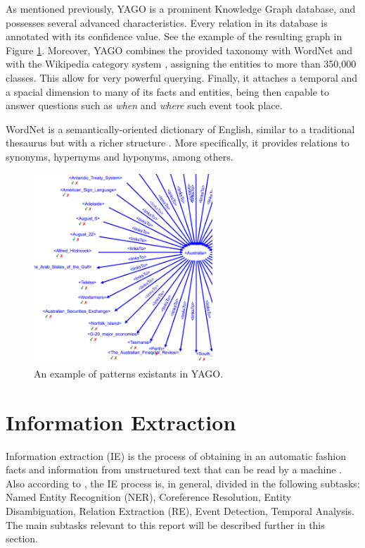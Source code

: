 \documentclass[11pt,a4paper,openright]{memoir}
\begin{document}
As mentioned previously, YAGO \cite{Suchanek2007} is a prominent Knowledge Graph database, and possesses several advanced characteristics. Every relation in its database is annotated with its confidence value. See the example of the resulting graph in Figure \ref{fig:yago_examples}. Moreover, YAGO combines the provided taxonomy with WordNet \cite{Miller:1995:WLD:219717.219748} and with the Wikipedia category system \cite{wiki}, assigning the entities to more than 350,000 classes. This allow for very powerful querying. Finally, it attaches a temporal and a spacial dimension to many of its facts and entities, being then capable to answer questions such as \emph{when} and \emph{where} such event took place.

WordNet is a semantically-oriented dictionary of English, similar to a traditional thesaurus but with a richer structure \cite{BirdKleinLoper09}. More specifically, it provides relations to synonyms, hypernyms and hyponyms, among others.

\begin{figure}[!htbp]
  \centering
    \includegraphics[width=0.6\textwidth]{./images/yago}
  \caption[An example of patterns existants in YAGO.]{An example of patterns existants in YAGO.}
  \label{fig:yago_examples}
\end{figure}

\section{Information Extraction}

Information extraction (IE) is the process of obtaining in an automatic fashion facts and information from unstructured text that can be read by a machine \cite{Jurafsky:2000:SLP:555733}. Also according to \cite{Jurafsky:2000:SLP:555733}, the IE process is, in general, divided in the following subtasks: Named Entity Recognition (NER), Coreference Resolution, Entity Disambiguation, Relation Extraction (RE), Event Detection, Temporal Analysis. The main subtasks relevant to this report will be described further in this section.
\end{document}
